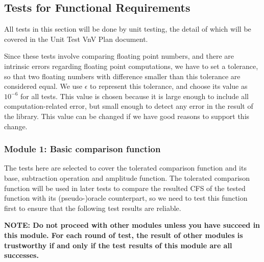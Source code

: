 \documentclass[12pt, titlepage]{article}
\begin{document}
\subsection{Tests for Functional Requirements} All tests in this section will be
done by unit testing, the detail of which will be covered in the Unit Test VnV
Plan document.

Since these tests involve comparing floating point numbers, and there are
intrinsic errors regarding floating point computations, we have to set a
tolerance, so that two floating numbers with difference smaller than this
tolerance are considered equal. We use $\epsilon$ to represent this tolerance,
and choose its value as $10^{-6}$ for all tests. This value is chosen because it
is large enough to include all computation-related error, but small enough to
detect any error in the result of the library. This value can be changed if we
have good reasons to support this change.  

\subsubsection{Module 1: Basic comparison function}

The tests here are selected to cover the tolerated comparison function and its
base, subtraction operation and amplitude function. The tolerated comparison
function will be used in later tests to compare the resulted CFS of the tested
function with its (pseudo-)oracle counterpart, so we need to test this function
first to ensure that the following test results are reliable.

\textbf{NOTE: Do not proceed with other modules unless you have succeed in this
module. For each round of test, the result of other modules is trustworthy if
and only if the test results of this module are all successes.}
\end{document}
